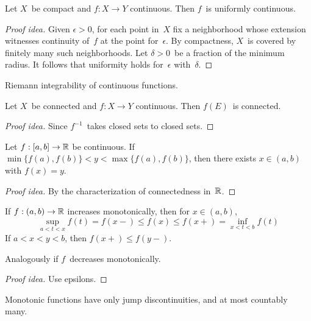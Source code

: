 \begin{thm}
Let \(X\)~be compact and \(f:X\to Y\) continuous. Then \(f\)~is uniformly continuous.
\end{thm}
\begin{proof}[Proof idea]
Given \(\epsilon>0\), for each point in~\(X\) fix a neighborhood whose extension witnesses continuity of~\(f\) at the point for~\(\epsilon\). By compactness, \(X\)~is covered by finitely many such neighborhoods. Let \(\delta>0\)~be a fraction of the minimum radius. It follows that uniformity holds for~\(\epsilon\) with~\(\delta\).
\end{proof}
\begin{app}
Riemann integrability of continuous functions.
\end{app}

\begin{thm}
Let \(X\)~be connected and \(f:X\to Y\) continuous. Then \(f(E)\)~is connected.
\end{thm}
\begin{proof}[Proof idea]
Since \(f^{-1}\)~takes closed sets to closed sets.
\end{proof}

\begin{cor}
Let \(f:[a,b]\to\mathbb{R}\) be continuous. If \(\min\{f(a),f(b)\}<y<\max\{f(a),f(b)\}\), then there exists \(x\in(a,b)\) with \(f(x)=y\).
\end{cor}
\begin{proof}[Proof idea]
By the characterization of connectedness in~\(\mathbb{R}\).
\end{proof}

\begin{thm}
If \(f:(a,b)\to\mathbb{R}\) increases monotonically, then for \(x\in(a,b)\),
\[\sup_{a<t<x} f(t)=f(x-)\le f(x)\le f(x+)=\inf_{x<t<b}f(t)\]
If \(a<x<y<b\), then \(f(x+)\le f(y-)\).

Analogously if \(f\)~decreases monotonically.
\end{thm}
\begin{proof}[Proof idea]
Use epsilons.
\end{proof}
\begin{app}
Monotonic functions have only jump discontinuities, and at most countably many.
\end{app}

